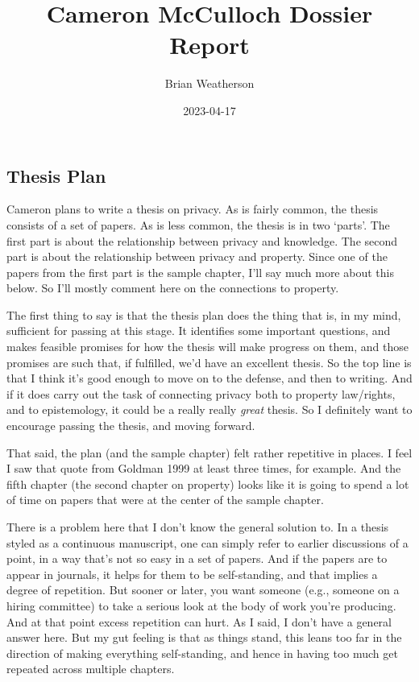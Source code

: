 \documentclass[
  letterpaper,
  DIV=11,
  numbers=noendperiod]{scrartcl}
\title{Cameron McCulloch Dossier Report}
\author{Brian Weatherson}
\date{2023-04-17}
\begin{document}
\maketitle
\ifdefined\Shaded\renewenvironment{Shaded}{\begin{tcolorbox}[borderline west={3pt}{0pt}{shadecolor}, sharp corners, frame hidden, interior hidden, breakable, boxrule=0pt, enhanced]}{\end{tcolorbox}}\fi

\hypertarget{thesis-plan}{%
\subsection{Thesis Plan}\label{thesis-plan}}

Cameron plans to write a thesis on privacy. As is fairly common, the
thesis consists of a set of papers. As is less common, the thesis is in
two `parts'. The first part is about the relationship between privacy
and knowledge. The second part is about the relationship between privacy
and property. Since one of the papers from the first part is the sample
chapter, I'll say much more about this below. So I'll mostly comment
here on the connections to property.

The first thing to say is that the thesis plan does the thing that is,
in my mind, sufficient for passing at this stage. It identifies some
important questions, and makes feasible promises for how the thesis will
make progress on them, and those promises are such that, if fulfilled,
we'd have an excellent thesis. So the top line is that I think it's good
enough to move on to the defense, and then to writing. And if it does
carry out the task of connecting privacy both to property law/rights,
and to epistemology, it could be a really really \emph{great} thesis. So
I definitely want to encourage passing the thesis, and moving forward.

That said, the plan (and the sample chapter) felt rather repetitive in
places. I feel I saw that quote from Goldman 1999 at least three times,
for example. And the fifth chapter (the second chapter on property)
looks like it is going to spend a lot of time on papers that were at the
center of the sample chapter.

There is a problem here that I don't know the general solution to. In a
thesis styled as a continuous manuscript, one can simply refer to
earlier discussions of a point, in a way that's not so easy in a set of
papers. And if the papers are to appear in journals, it helps for them
to be self-standing, and that implies a degree of repetition. But sooner
or later, you want someone (e.g., someone on a hiring committee) to take
a serious look at the body of work you're producing. And at that point
excess repetition can hurt. As I said, I don't have a general answer
here. But my gut feeling is that as things stand, this leans too far in
the direction of making everything self-standing, and hence in having
too much get repeated across multiple chapters.
\end{document}
